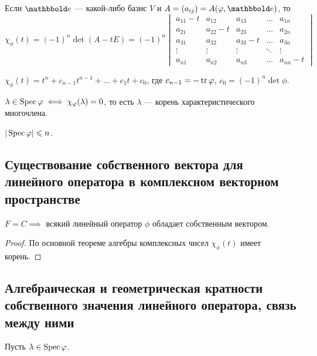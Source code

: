 Если $\E$ --- какой-либо базис $V$ и $A = (a_{ij}) = A(\phi, \E)$, то
\begin{equation*}
    \chi_\phi(t) = (-1)^n \det (A - tE) = (-1)^n \begin{vmatrix} 
        a_{11} - t & a_{12} & a_{13} & \dots & a_{1n} \\ 
        a_{21} & a_{22} - t & a_{23} & \dots & a_{2n} \\
        a_{31} & a_{32} & a_{33} - t & \dots & a_{3n} \\
        \vdots & \vdots & \vdots & \ddots & \vdots \\
        a_{n1} & a_{n2} & a_{n3} & \dots & a_{nn} - t
    \end{vmatrix}
\end{equation*}

$\chi_\phi(t) = t^n + c_{n - 1}t^{n - 1} + \dots + c_1 t + c_0$, где $c_{n - 1} = -\operatorname{\mathop{\mathrm{tr}}} \varphi$, $c_0 = (-1)^n \det \phi$.

\begin{corollary}
    $\lambda \in \operatorname{\mathop{\mathrm{Spec}}} \varphi \iff \chi_\varphi(\lambda) = 0$, то есть $\lambda$ --- корень характеристического многочлена.
\end{corollary}

\begin{corollary}
    $|\operatorname{\mathop{\mathrm{Spec}}} \varphi| \leqslant n$.   
\end{corollary}


\subsection{Существование собственного вектора для линейного оператора в комплексном векторном пространстве}

\begin{corollary}
    $F = C \implies $ всякий линейный оператор $\phi$ обладает собственным вектором.
\end{corollary}

\begin{proof}
    По основной теореме алгебры комплексных чисел $\chi_\phi(t)$ имеет корень. 
\end{proof}


\subsection{Алгебраическая и геометрическая кратности собственного значения линейного оператора, связь между ними}

Пусть $\lambda \in \operatorname{\mathop{\mathrm{Spec}}} \varphi$.

